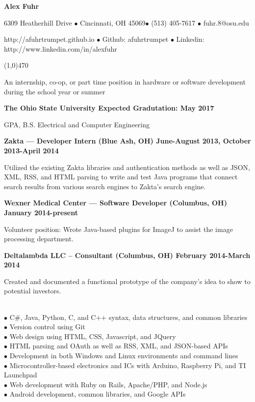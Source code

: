 \documentclass[10pt]{article}
\begin{document}
\centerline{{\LARGE \bf Alex Fuhr}}

\centerline{6309 Heatherhill Drive $\bullet$ Cincinnati, OH 45069$\bullet$ (513) 405-7617 $\bullet$ fuhr.8@osu.edu}
\centerline{http://afuhrtrumpet.github.io $\bullet$ Github: afuhrtrumpet $\bullet$ Linkedin: http://www.linkedin.com/in/alexfuhr}
\noindent
\line(1,0){470}\\

\smallskip

\noindent
An internship, co-op, or part time position in hardware or software development during the school year or summer
\medskip

\smallskip

\centerline{{\large \bf The Ohio State University \hfill Expected Gradutation: May 2017}}
 GPA, B.S. Electrical and Computer Engineering
\medskip

\smallskip

\centerline{{\large \bf Zakta --- Developer Intern (Blue Ash, OH) \hfill June-August 2013, October 2013-April 2014}}
\noindent
Utilized the existing Zakta libraries and authentication methods as well as JSON, XML, RSS, and HTML parsing to write and test Java programs that connect search results from various search engines to Zakta's search engine.

\centerline{{\large \bf Wexner Medical Center --- Software Developer (Columbus, OH) \hfill January 2014-present}}
\noindent
Volunteer position: Wrote Java-based plugins for ImageJ to assist the image processing department.

\centerline{{\large \bf Deltalambda LLC -- Consultant (Columbus, OH) \hfill February 2014-March 2014}}
\noindent
Created and documented a functional prototype of the company's idea to show to potential investors.
\medskip

\\
\smallskip
$\bullet$ C\#, Java, Python, C, and C++ syntax, data structures, and common libraries\\
$\bullet$ Version control using Git\\
$\bullet$ Web design using HTML, CSS, Javascript, and JQuery\\
$\bullet$ HTML parsing and OAuth as well as RSS, XML, and JSON-based APIs\\
$\bullet$ Development in both Windows and Linux environments and command lines\\
$\bullet$ Microcontroller-based electronics and ICs with Arduino, Raspberry Pi, and TI Launchpad\\
$\bullet$ Web development with Ruby on Rails, Apache/PHP, and Node.js\\
$\bullet$ Android development, common libraries, and Google APIs
\medskip
\end{document}
